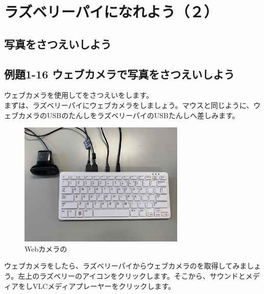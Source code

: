 \clearpage

\section{ラズベリーパイになれよう（２）}
\subsection{写真をさつえいしよう}
\subsection{例題1-16 ウェブカメラで写真をさつえいしよう}
\noindent
ウェブカメラを使用してをさつえいをします。\\
まずは、ラズベリーパイにウェブカメラをしましょう。マウスと同じように、ウェブカメラのUSBのたんしをラズベリーパイのUSBたんしへ差しみます。


\begin{figure}[ht]
  \centering
  \begin{minipage}{8.528cm}
    {\upshape
      \includegraphics[width=7.904cm]{text01-img/textbook-img112-2023.jpg}
      \caption{Webカメラの}
    }
  \end{minipage}
\end{figure}
\noindent
ウェブカメラをしたら、ラズベリーパイからウェブカメラのを取得してみましょう。左上のラズベリーのアイコンをクリックします。そこから、サウンドとメディアをしVLCメディアプレーヤーをクリックします。

